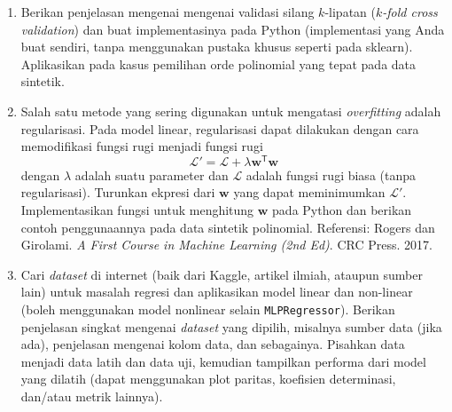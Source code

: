 \documentclass[a4paper,11pt]{article} %
\newcommand{\pyinline}[1]{\texttt{#1}}
\begin{document}
\begin{enumerate}
%
%
\item Berikan penjelasan mengenai mengenai validasi silang $k$-lipatan
($k$\textit{-fold cross validation})
dan buat implementasinya pada Python (implementasi yang Anda buat sendiri,
tanpa menggunakan pustaka khusus seperti pada sklearn).
Aplikasikan pada kasus pemilihan orde polinomial yang tepat pada
data sintetik.
%
%
\item Salah satu metode yang sering digunakan untuk mengatasi
\textit{overfitting} adalah regularisasi. Pada model linear, regularisasi
dapat dilakukan dengan cara memodifikasi fungsi rugi menjadi
fungsi rugi
$$
\mathcal{L}' = \mathcal{L} + \lambda \mathbf{w}^{\mathsf{T}}\mathbf{w}
$$
dengan $\lambda$ adalah suatu parameter dan $\mathcal{L}$
adalah fungsi rugi biasa (tanpa regularisasi).
Turunkan ekpresi dari $\mathbf{w}$ yang dapat meminimumkan $\mathcal{L}'$.
Implementasikan fungsi untuk menghitung $\mathbf{w}$ pada Python
dan berikan contoh penggunaannya pada data sintetik polinomial.
Referensi: Rogers dan Girolami.
\textit{A First Course in Machine Learning (2nd Ed)}.
CRC Press. 2017.
%
%
\item Cari \textit{dataset} di internet (baik dari Kaggle, artikel ilmiah,
ataupun sumber lain) untuk masalah regresi dan aplikasikan model linear
dan non-linear (boleh menggunakan
model nonlinear selain \pyinline{MLPRegressor}). Berikan penjelasan singkat
mengenai \textit{dataset} yang dipilih, misalnya sumber data (jika ada),
penjelasan mengenai kolom data, dan sebagainya.
Pisahkan data menjadi data latih dan data uji, kemudian tampilkan
performa dari model yang dilatih (dapat menggunakan plot paritas, koefisien
determinasi, dan/atau metrik lainnya). 
\end{enumerate}
\end{document}
